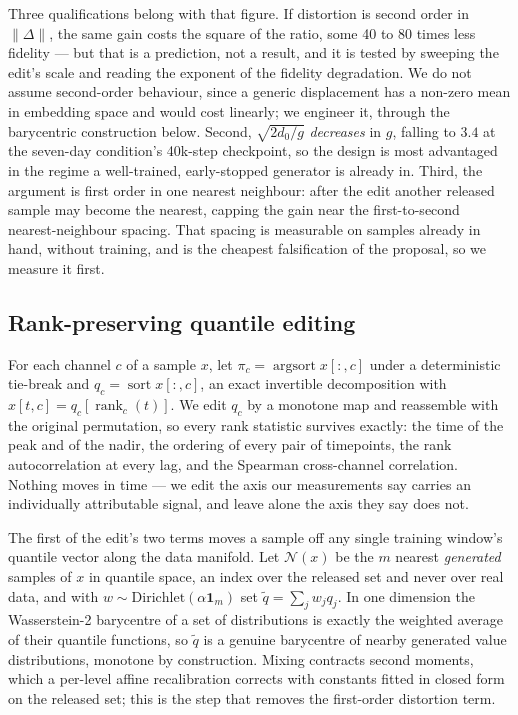 \documentclass[journal]{IEEEtran}
\begin{document}
Three qualifications belong with that figure. If distortion is second order in
$\lVert\Delta\rVert$, the same gain costs the square of the ratio, some 40 to 80 times less
fidelity --- but that is a prediction, not a result, and it is tested by sweeping the edit's
scale and reading the exponent of the fidelity degradation. We do not assume second-order
behaviour, since a generic displacement has a non-zero mean in embedding space and would cost
linearly; we engineer it, through the barycentric construction below. Second,
$\sqrt{2d_0/g}$ \emph{decreases} in $g$, falling to $3.4$ at the seven-day condition's
40k-step checkpoint, so the design is most advantaged in the regime a well-trained,
early-stopped generator is already in. Third, the argument is first order in one nearest
neighbour: after the edit another released sample may become the nearest, capping the gain
near the first-to-second nearest-neighbour spacing. That spacing is measurable on samples
already in hand, without training, and is the cheapest falsification of the proposal, so we
measure it first.

\subsection{Rank-preserving quantile editing}

For each channel $c$ of a sample $x$, let $\pi_c=\operatorname{argsort}x[:,c]$ under a
deterministic tie-break and $q_c=\operatorname{sort}x[:,c]$, an exact invertible
decomposition with $x[t,c]=q_c[\operatorname{rank}_c(t)]$. We edit $q_c$ by a monotone map
and reassemble with the original permutation, so every rank statistic survives exactly: the
time of the peak and of the nadir, the ordering of every pair of timepoints, the rank
autocorrelation at every lag, and the Spearman cross-channel correlation. Nothing moves in
time --- we edit the axis our measurements say carries an individually attributable signal,
and leave alone the axis they say does not.

The first of the edit's two terms moves a sample off any single training window's quantile
vector along the data manifold. Let $\mathcal{N}(x)$ be the $m$ nearest \emph{generated}
samples of $x$ in quantile space, an index over the released set and never over real data,
and with $w\sim\mathrm{Dirichlet}(\alpha\mathbf{1}_m)$ set $\tilde q=\sum_j w_jq_j$. In one
dimension the Wasserstein-2 barycentre of a set of distributions is exactly the weighted
average of their quantile functions, so $\tilde q$ is a genuine barycentre of nearby
generated value distributions, monotone by construction. Mixing contracts second moments,
which a per-level affine recalibration corrects with constants fitted in closed form on the
released set; this is the step that removes the first-order distortion term.
\end{document}

